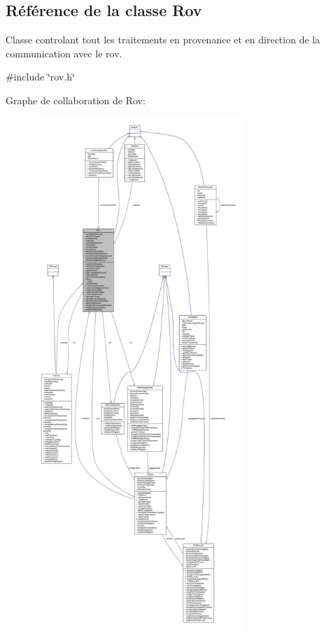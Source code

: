 \hypertarget{class_rov}{}\subsection{Référence de la classe Rov}
\label{class_rov}


Classe controlant tout les traitements en provenance et en direction de la communication avec le rov.  




{\ttfamily \#include \char`\"{}rov.\+h\char`\"{}}



Graphe de collaboration de Rov\+:
\nopagebreak
\begin{figure}[H]
\begin{center}
\leavevmode
\includegraphics[height=550pt]{class_rov__coll__graph}
\end{center}
\end{figure}
